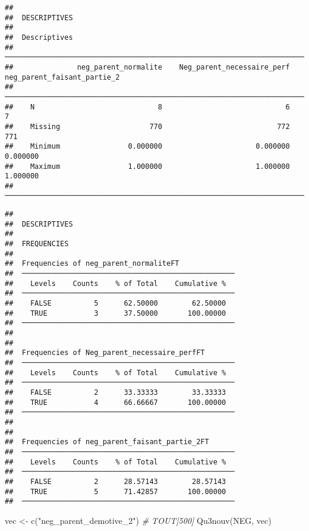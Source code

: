 \documentclass[
]{article}
\newenvironment{Shaded}{\begin{snugshade}}{\end{snugshade}}
\newcommand{\CommentTok}[1]{\textcolor[rgb]{0.56,0.35,0.01}{\textit{#1}}}
\newcommand{\FunctionTok}[1]{\textcolor[rgb]{0.00,0.00,0.00}{#1}}
\newcommand{\NormalTok}[1]{#1}
\newcommand{\OtherTok}[1]{\textcolor[rgb]{0.56,0.35,0.01}{#1}}
\newcommand{\StringTok}[1]{\textcolor[rgb]{0.31,0.60,0.02}{#1}}
\begin{document}
\begin{verbatim}
## 
##  DESCRIPTIVES
## 
##  Descriptives                                                                                     
##  ──────────────────────────────────────────────────────────────────────────────────────────────── 
##               neg_parent_normalite    Neg_parent_necessaire_perf    neg_parent_faisant_partie_2   
##  ──────────────────────────────────────────────────────────────────────────────────────────────── 
##    N                             8                             6                              7   
##    Missing                     770                           772                            771   
##    Minimum                0.000000                      0.000000                       0.000000   
##    Maximum                1.000000                      1.000000                       1.000000   
##  ────────────────────────────────────────────────────────────────────────────────────────────────
\end{verbatim}

\begin{verbatim}
## 
##  DESCRIPTIVES
## 
##  FREQUENCIES
## 
##  Frequencies of neg_parent_normaliteFT              
##  ────────────────────────────────────────────────── 
##    Levels    Counts    % of Total    Cumulative %   
##  ────────────────────────────────────────────────── 
##    FALSE          5      62.50000        62.50000   
##    TRUE           3      37.50000       100.00000   
##  ────────────────────────────────────────────────── 
## 
## 
##  Frequencies of Neg_parent_necessaire_perfFT        
##  ────────────────────────────────────────────────── 
##    Levels    Counts    % of Total    Cumulative %   
##  ────────────────────────────────────────────────── 
##    FALSE          2      33.33333        33.33333   
##    TRUE           4      66.66667       100.00000   
##  ────────────────────────────────────────────────── 
## 
## 
##  Frequencies of neg_parent_faisant_partie_2FT       
##  ────────────────────────────────────────────────── 
##    Levels    Counts    % of Total    Cumulative %   
##  ────────────────────────────────────────────────── 
##    FALSE          2      28.57143        28.57143   
##    TRUE           5      71.42857       100.00000   
##  ──────────────────────────────────────────────────
\end{verbatim}

\begin{Shaded}
\begin{Highlighting}[]
\NormalTok{vec }\OtherTok{\textless{}{-}} \FunctionTok{c}\NormalTok{(}\StringTok{"neg\_parent\_demotive\_2"}\NormalTok{)  }\CommentTok{\# TOUT[500]}
\FunctionTok{Qu3nouv}\NormalTok{(NEG, vec)}
\end{Highlighting}
\end{Shaded}
\end{document}
